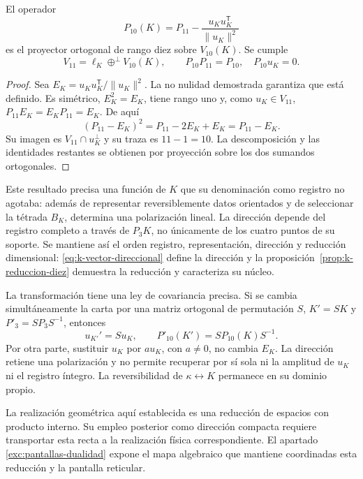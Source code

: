 \begin{proposition}
\label{prop:k-reduccion-diez}
El operador
\begin{equation}
 P_{10}(K)=P_{11}
       -\frac{u_Ku_K^{\mathsf T}}{\lVert u_K\rVert^2}
 \label{eq:k-proyector-diez}
\end{equation}
es el proyector ortogonal de rango diez sobre \(V_{10}(K)\). Se cumple
\[
 V_{11}=\ell_K\mathbin{\oplus^{\perp}}V_{10}(K),
 \qquad P_{10}P_{11}=P_{10},\quad P_{10}u_K=0.
\]
\end{proposition}
\begin{proof}
Sea \(E_K=u_Ku_K^{\mathsf T}/\lVert u_K\rVert^2\). La
no nulidad demostrada garantiza que está definido. Es simétrico,
\(E_K^2=E_K\), tiene rango uno y, como \(u_K\in V_{11}\),
\(P_{11}E_K=E_KP_{11}=E_K\). De aquí
\[
 (P_{11}-E_K)^2=P_{11}-2E_K+E_K=P_{11}-E_K.
\]
Su imagen es \(V_{11}\cap u_K^\perp\) y su traza es
\(11-1=10\). La descomposición y las identidades restantes se
obtienen por proyección sobre los dos sumandos ortogonales.
\end{proof}

Este resultado precisa una función de \(K\) que su denominación como
registro no agotaba: además de representar reversiblemente datos
orientados y de seleccionar la tétrada \(B_K\), determina una
polarización lineal. La dirección depende del registro completo a
través de \(P_3K\), no únicamente de los cuatro puntos de su soporte.
Se mantiene así el orden registro, representación, dirección y
reducción dimensional: \eqref{eq:k-vector-direccional} define la
dirección y la proposición~\ref{prop:k-reduccion-diez} demuestra
la reducción y caracteriza su núcleo.

La transformación tiene una ley de covariancia precisa. Si se cambia
simultáneamente la carta por una matriz ortogonal de permutación \(S\),
\(K'=SK\) y \(P'_3=SP_3S^{-1}\), entonces
\[
 u_{K'}'=Su_K,\qquad P'_{10}(K')=SP_{10}(K)S^{-1}.
\]
Por otra parte, sustituir \(u_K\) por \(a u_K\), con \(a\ne0\),
no cambia \(E_K\). La dirección retiene una polarización y no
permite recuperar por sí sola ni la amplitud de \(u_K\) ni el
registro íntegro. La reversibilidad de \(\kappa\leftrightarrow K\)
permanece en su dominio propio.

La realización geométrica aquí establecida es una reducción de espacios
con producto interno. Su empleo posterior como dirección compacta
requiere transportar esta recta a la realización física correspondiente.
El apartado \ref{exc:pantallas-dualidad} expone el mapa algebraico
que mantiene coordinadas esta reducción y la pantalla reticular.
